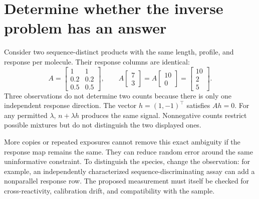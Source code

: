 \section{Determine whether the inverse problem has an answer}
Consider two sequence-distinct products with the same length, profile, and response per molecule. Their response columns are identical:
\begin{equation}
A=\begin{bmatrix}1&1\\0.2&0.2\\0.5&0.5\end{bmatrix},
\qquad
A\begin{bmatrix}7\\3\end{bmatrix}
=A\begin{bmatrix}10\\0\end{bmatrix}
=\begin{bmatrix}10\\2\\5\end{bmatrix}. \label{eq:ambiguous}
\end{equation}
Three observations do not determine two counts because there is only one independent response direction. The vector $h=(1,-1)^\top$ satisfies $Ah=0$. For any permitted $\lambda$, $n+\lambda h$ produces the same signal. Nonnegative counts restrict possible mixtures but do not distinguish the two displayed ones.


More copies or repeated exposures cannot remove this exact ambiguity if the response map remains the same. They can reduce random error around the same uninformative constraint. To distinguish the species, change the observation: for example, an independently characterized sequence-discriminating assay can add a nonparallel response row. The proposed measurement must itself be checked for cross-reactivity, calibration drift, and compatibility with the sample.

